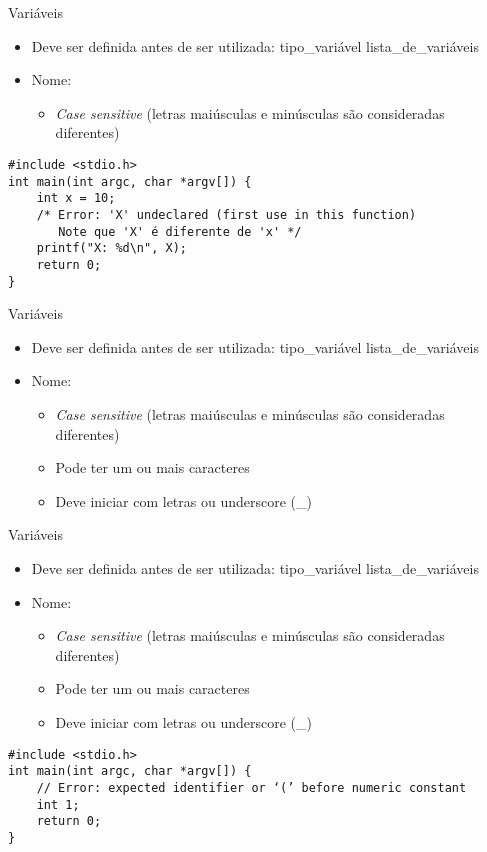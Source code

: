 \documentclass[t, aspectratio=169]{beamer}
\begin{document}
\begin{frame}[label={sec:org7dbe2d6},fragile]{Variáveis}
 \begin{itemize}
\item Deve ser definida antes de ser utilizada: \alert{\color{highlight}tipo\_variável \color{blue!80}lista\_de\_variáveis}
\item \color{black}Nome:
\begin{itemize}
\item \emph{Case sensitive} (letras maiúsculas e minúsculas são consideradas diferentes)
\end{itemize}
\end{itemize}

\begin{verbatim}
#include <stdio.h>
int main(int argc, char *argv[]) {
    int x = 10;
    /* Error: 'X' undeclared (first use in this function)
       Note que 'X' é diferente de 'x' */
    printf("X: %d\n", X);
    return 0;
}
\end{verbatim}
\end{frame}

\begin{frame}[label={sec:orgf6ef75f}]{Variáveis}
\begin{itemize}
\item Deve ser definida antes de ser utilizada: \alert{\color{highlight}tipo\_variável \color{blue!80}lista\_de\_variáveis}
\item \color{black}Nome:
\begin{itemize}
\item \emph{Case sensitive} (letras maiúsculas e minúsculas são consideradas diferentes)
\item Pode ter um ou mais caracteres
\item Deve iniciar com letras ou underscore (\_)
\end{itemize}
\end{itemize}
\end{frame}

\begin{frame}[label={sec:org4507db5},fragile]{Variáveis}
 \begin{itemize}
\item Deve ser definida antes de ser utilizada: \alert{\color{highlight}tipo\_variável \color{blue!80}lista\_de\_variáveis}
\item \color{black}Nome:
\begin{itemize}
\item \emph{Case sensitive} (letras maiúsculas e minúsculas são consideradas diferentes)
\item Pode ter um ou mais caracteres
\item Deve iniciar com letras ou underscore (\_)
\end{itemize}
\end{itemize}

\begin{verbatim}
#include <stdio.h>
int main(int argc, char *argv[]) {
    // Error: expected identifier or ‘(’ before numeric constant
    int 1;
    return 0;
}
\end{verbatim}
\end{frame}
\end{document}
